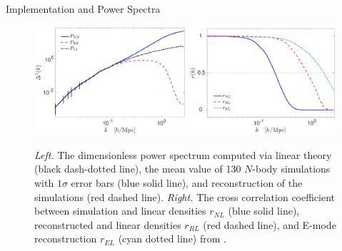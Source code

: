 \begin{section}{Implementation and Power Spectra}
  \begin{figure}
    \centering
    \includegraphics[width=0.5\textwidth]{fig2a.pdf}
    \includegraphics[width=0.485\textwidth]{fig2b.pdf}
    \caption{{\it Left.} The dimensionless power spectrum computed via
      linear theory (black dash-dotted line), the mean value of 130 $N$-body
      simulations with $1\sigma$ error bars (blue solid line), and reconstruction
      of the simulations (red dashed line).  {\it Right.} The cross correlation
      coefficient between simulation and linear densities $r_{NL}$ (blue solid line),
       reconstructed and linear densities $r_{RL}$ (red dashed line), and E-mode reconstruction $r_{EL}$ (cyan dotted line) from \citealt{bib:Yu2016}.}
    \label{fig:cp}
  \end{figure}


\end{section}

